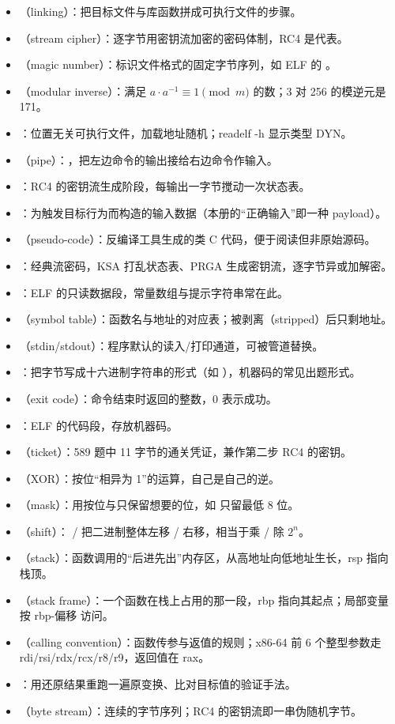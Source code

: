 \documentclass[UTF8,12pt,oneside]{ctexbook}
\begin{document}
\begin{itemize}
\item {}（linking）：把目标文件与库函数拼成可执行文件的步骤。
\item {}（stream cipher）：逐字节用密钥流加密的密码体制，RC4 是代表。
\item {}（magic number）：标识文件格式的固定字节序列，如 ELF 的 。
\item {}（modular inverse）：满足 $a\cdot a^{-1}\equiv1\pmod m$ 的数；3 对 256 的模逆元是 171。
\item {}：位置无关可执行文件，加载地址随机；readelf -h 显示类型 DYN。
\item {}（pipe）：\code{|}，把左边命令的输出接给右边命令作输入。
\item {}：RC4 的密钥流生成阶段，每输出一字节搅动一次状态表。
\item {}：为触发目标行为而构造的输入数据（本册的“正确输入”即一种 payload）。
\item {}（pseudo-code）：反编译工具生成的类 C 代码，便于阅读但非原始源码。
\item {}：经典流密码，KSA 打乱状态表、PRGA 生成密钥流，逐字节异或加解密。
\item {}：ELF 的只读数据段，常量数组与提示字符串常在此。
\item {}（symbol table）：函数名与地址的对应表；被剥离（stripped）后只剩地址。
\item {}（stdin/stdout）：程序默认的读入/打印通道，可被管道替换。
\item {}：把字节写成十六进制字符串的形式（如 ），机器码的常见出题形式。
\item {}（exit code）：命令结束时返回的整数，0 表示成功。
\item {}：ELF 的代码段，存放机器码。
\item {}（ticket）：589 题中 11 字节的通关凭证，兼作第二步 RC4 的密钥。
\item {}（XOR）：按位“相异为 1”的运算，自己是自己的逆。
\item {}（mask）：用按位与只保留想要的位，如  只留最低 8 位。
\item {}（shift）：\code{<<} / \code{>>} 把二进制整体左移 / 右移，相当于乘 / 除 $2^n$。
\item {}（stack）：函数调用的“后进先出”内存区，从高地址向低地址生长，rsp 指向栈顶。
\item {}（stack frame）：一个函数在栈上占用的那一段，rbp 指向其起点；局部变量按 rbp-偏移 访问。
\item {}（calling convention）：函数传参与返值的规则；x86-64 前 6 个整型参数走 rdi/rsi/rdx/rcx/r8/r9，返回值在 rax。
\item {}：用还原结果重跑一遍原变换、比对目标值的验证手法。
\item {}（byte stream）：连续的字节序列；RC4 的密钥流即一串伪随机字节。
\end{itemize}
\end{document}
